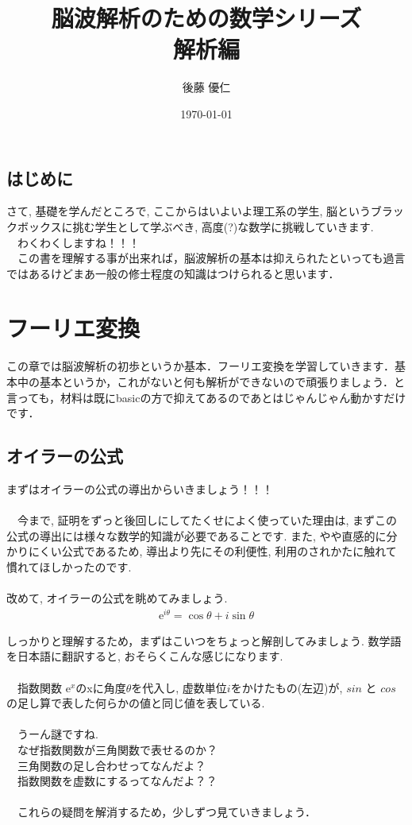 \documentclass[11pt,a4paper]{ujreport} 	%
\title{脳波解析のための数学シリーズ\\
 解析編}
\author{後藤 優仁}
\date{\today}
\begin{document}
\maketitle
%
%
\tableofcontents
\newpage

\section{はじめに}

さて, 基礎を学んだところで, ここからはいよいよ理工系の学生, 脳というブラックボックスに挑む学生として学ぶべき, 高度(?)な数学に挑戦していきます.\\ 
　わくわくしますね！！！\\
　この書を理解する事が出来れば，脳波解析の基本は抑えられたといっても過言ではあるけどまあ一般の修士程度の知識はつけられると思います．
\chapter{フーリエ変換}
この章では脳波解析の初歩というか基本．フーリエ変換を学習していきます．基本中の基本というか，これがないと何も解析ができないので頑張りましょう．と言っても，材料は既にbasicの方で抑えてあるのであとはじゃんじゃん動かすだけです．
\section{オイラーの公式}
まずはオイラーの公式の導出からいきましょう！！！\\
\\
　今まで, 証明をずっと後回しにしてたくせによく使っていた理由は, まずこの公式の導出には様々な数学的知識が必要であることです. また, やや直感的に分かりにくい公式であるため, 導出より先にその利便性, 利用のされかたに触れて慣れてほしかったのです.\\
\\
改めて, オイラーの公式を眺めてみましょう.\\
\begin{eqnarray}
\mathrm{e}^{i\theta} = \cos\theta + i\sin\theta
\end{eqnarray}

しっかりと理解するため，まずはこいつをちょっと解剖してみましょう. 数学語を日本語に翻訳すると, おそらくこんな感じになります.
\\
\\
　指数関数 $\mathrm{e}^x$のxに角度$\theta$を代入し, 虚数単位$i$をかけたもの(左辺)が, $sin$ と $cos$ の足し算で表した何らかの値と同じ値を表している.\\
\\
　うーん謎ですね.\\
　なぜ指数関数が三角関数で表せるのか？\\
　三角関数の足し合わせってなんだよ？\\
　指数関数を虚数にするってなんだよ？？\\
\\
　これらの疑問を解消するため，少しずつ見ていきましょう．
\end{document}
